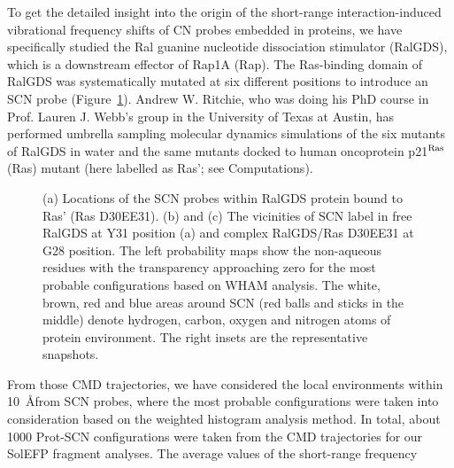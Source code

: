 \documentclass[a4paper,titlepage,twoside,fleqn,12pt]{book}
\begin{document}
\begin{refsection}
To get the detailed insight into the origin of
the short\hyp{}range interaction\hyp{}induced vibrational frequency
shifts of CN probes embedded in proteins, we have specifically
studied the Ral guanine nucleotide dissociation stimulator
(RalGDS), which is a downstream effector of Rap1A (Rap). The
Ras\hyp{}binding domain of RalGDS was systematically mutated at six
different positions to introduce an SCN probe (Figure~\ref{f:prot}).   %
Andrew W. Ritchie, who was doing his PhD course in Prof. Lauren J. Webb's 
group in the University of Texas at Austin,
has performed umbrella sampling molecular dynamics
simulations of the six mutants of RalGDS in water and the same
mutants docked to human oncoprotein p21$^{\rm Ras}$ (Ras) mutant
(here labelled as Ras'; see Computations). 
%
\begin{figure}[t!]
\centering
\setlength\fboxsep{0.4pt}
\setlength\fboxrule{0.5pt}
\caption{
(a) Locations of the SCN probes within RalGDS protein bound to Ras' (Ras D30E{\textunderscore}E31).
(b) and (c) The vicinities of SCN label in free RalGDS at Y31 position (a)
and complex RalGDS/Ras D30E{\textunderscore}E31 at G28 position. The left probability maps show the
non\hyp{}aqueous residues with the transparency approaching zero for the most probable
configurations based on WHAM analysis. The white, brown, red and blue areas around SCN (red balls and sticks
in the middle) 
denote hydrogen, carbon, oxygen and nitrogen atoms of protein environment. The right insets are the representative
snapshots.
}
\label{f:prot}
\end{figure}
%
From
those CMD trajectories, we have considered the local
environments within 10~\AA from SCN probes, 
where the most probable configurations were taken
into consideration based on the weighted histogram analysis
method. In total, about 1000 Prot-SCN configurations were
taken from the CMD trajectories for our SolEFP fragment
analyses. The average values of the short\hyp{}range frequency

\end{refsection}
\end{document}
